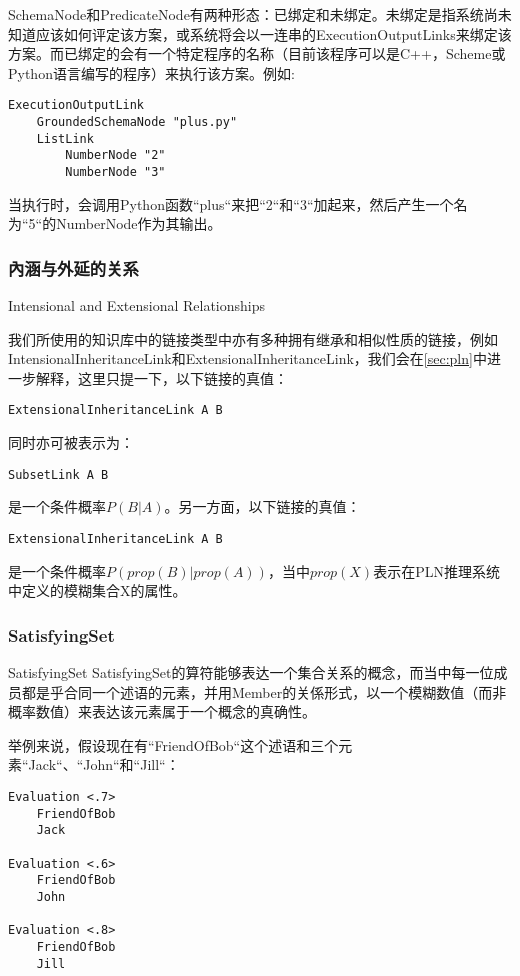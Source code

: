 SchemaNode和PredicateNode有两种形态：已绑定和未绑定。未绑定是指系统尚未知道应该如何评定该方案，或系统将会以一连串的ExecutionOutputLinks来绑定该方案。而已绑定的会有一个特定程序的名称（目前该程序可以是C++，Scheme或Python语言编写的程序）来执行该方案。例如:

\begin{verbatim}
ExecutionOutputLink
	GroundedSchemaNode "plus.py"
	ListLink
		NumberNode "2"
		NumberNode "3"
\end{verbatim}

\noindent 当执行时，会调用Python函数“plus“来把“2“和“3“加起来，然后产生一个名为“5“的NumberNode作为其输出。

\subsubsection{內涵与外延的关系}{Intensional and Extensional Relationships}


我们所使用的知识库中的链接类型中亦有多种拥有继承和相似性质的链接，例如IntensionalInheritanceLink和ExtensionalInheritanceLink，我们会在\ref{sec:pln}中进一步解释，这里只提一下，以下链接的真值：

\begin{verbatim}
ExtensionalInheritanceLink A B
\end{verbatim}

\noindent 同时亦可被表示为：

\begin{verbatim}
SubsetLink A B
\end{verbatim}

\noindent 是一个条件概率$P(B|A)$。另一方面，以下链接的真值：

\begin{verbatim}
ExtensionalInheritanceLink A B
\end{verbatim}

\noindent 是一个条件概率$P(prop(B)|prop(A))$，当中$prop(X)$表示在PLN推理系统中定义的模糊集合X的属性。

\subsubsection{SatisfyingSet}{SatisfyingSet}
SatisfyingSet的算符能够表达一个集合关系的概念，而当中每一位成员都是乎合同一个述语的元素，并用Member的关係形式，以一个模糊数值（而非概率数值）来表达该元素属于一个概念的真确性。

举例来说，假设现在有“FriendOfBob“这个述语和三个元素“Jack“、“John“和“Jill“：

\begin{verbatim}
Evaluation <.7>
	FriendOfBob
	Jack

Evaluation <.6>
	FriendOfBob
	John

Evaluation <.8>
	FriendOfBob
	Jill
\end{verbatim}

